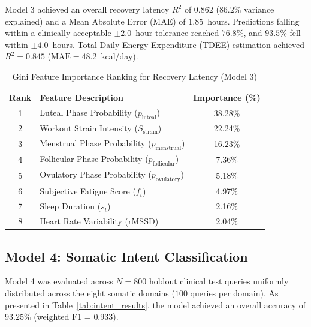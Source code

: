 \documentclass[conference]{IEEEtran}
\begin{document}
Model 3 achieved an overall recovery latency $R^2$ of \textbf{$0.862$} ($86.2\%$ variance explained) and a Mean Absolute Error (MAE) of $1.85$~hours. Predictions falling within a clinically acceptable $\pm 2.0$~hour tolerance reached $76.8\%$, and $93.5\%$ fell within $\pm 4.0$~hours. Total Daily Energy Expenditure (TDEE) estimation achieved $R^2 = 0.845$ ($\text{MAE} = 48.2$~kcal/day).

\begin{table}[htbp]
\caption{Gini Feature Importance Ranking for Recovery Latency (Model 3)}
\label{tab:gini_importance}
\centering
\begin{tabular}{clc}
\toprule
\textbf{Rank} & \textbf{Feature Description} & \textbf{Importance (\%)} \\
\midrule
1 & Luteal Phase Probability ($p_{\text{luteal}}$) & 38.28\% \\
2 & Workout Strain Intensity ($S_{\text{strain}}$) & 22.24\% \\
3 & Menstrual Phase Probability ($p_{\text{menstrual}}$) & 16.23\% \\
4 & Follicular Phase Probability ($p_{\text{follicular}}$) & 7.36\% \\
5 & Ovulatory Phase Probability ($p_{\text{ovulatory}}$) & 5.18\% \\
6 & Subjective Fatigue Score ($f_t$) & 4.97\% \\
7 & Sleep Duration ($s_t$) & 2.16\% \\
8 & Heart Rate Variability ($\text{rMSSD}$) & 2.04\% \\
\bottomrule
\end{tabular}
\end{table}

\subsection{Model 4: Somatic Intent Classification}
Model 4 was evaluated across $N = 800$ holdout clinical test queries uniformly distributed across the eight somatic domains ($100$ queries per domain). As presented in Table~\ref{tab:intent_results}, the model achieved an overall accuracy of \textbf{$93.25\%$} (weighted F1 = $0.933$).
\end{document}
